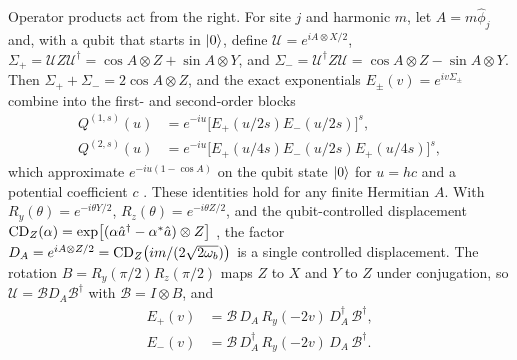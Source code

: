 \documentclass[pra,twocolumn,superscriptaddress,nofootinbib,floatfix]{revtex4-2}
\theoremstyle{remark}
\begin{document}
Operator products act from the right. For site \(j\) and harmonic \(m\), let \(A=m\hat\phi_j\) and, with a qubit that starts in \(\ket0\), define \(\mathcal U=e^{iA\otimes X/2}\), \(\Sigma_+=\mathcal UZ\mathcal U^\dagger=\cos A\otimes Z+\sin A\otimes Y\), and \(\Sigma_-=\mathcal U^\dagger Z\mathcal U=\cos A\otimes Z-\sin A\otimes Y\). Then \(\Sigma_++\Sigma_-=2\cos A\otimes Z\), and the exact exponentials \(E_\pm(v)=e^{iv\Sigma_\pm}\) combine into the first- and second-order blocks
\begin{align}
Q^{(1,s)}(u)&=e^{-iu}\big[E_+(u/2s)E_-(u/2s)\big]^s,\nonumber\\
Q^{(2,s)}(u)&=e^{-iu}\big[E_+(u/4s)E_-(u/2s)E_+(u/4s)\big]^s,
\end{align}
which approximate \(e^{-iu(1-\cos A)}\) on the qubit state \(\ket0\) for \(u=hc\) and a potential coefficient \(c\) \cite{Rainaldi2026TrigonometricCV}. These identities hold for any finite Hermitian \(A\). With \(R_y(\theta)=e^{-i\theta Y/2}\), \(R_z(\theta)=e^{-i\theta Z/2}\), and the qubit-controlled displacement \({\rm CD}_Z(\alpha)=\exp[(\alpha\hat a^\dagger-\alpha^*\hat a)\otimes Z]\) \cite{Eickbusch2022ECD}, the factor \(D_A=e^{iA\otimes Z/2}={\rm CD}_Z\bigl(im/(2\sqrt{2\omega_b})\bigr)\) is a single controlled displacement. The rotation \(B=R_y(\pi/2)R_z(\pi/2)\) maps \(Z\) to \(X\) and \(Y\) to \(Z\) under conjugation, so \(\mathcal U=\mathcal BD_A\mathcal B^\dagger\) with \(\mathcal B=I\otimes B\), and
\begin{align}
E_+(v)&=\mathcal B\,D_A\,R_y(-2v)\,D_A^\dagger\,\mathcal B^\dagger,\nonumber\\
E_-(v)&=\mathcal B\,D_A^\dagger\,R_y(-2v)\,D_A\,\mathcal B^\dagger .
\end{align}
\end{document}

